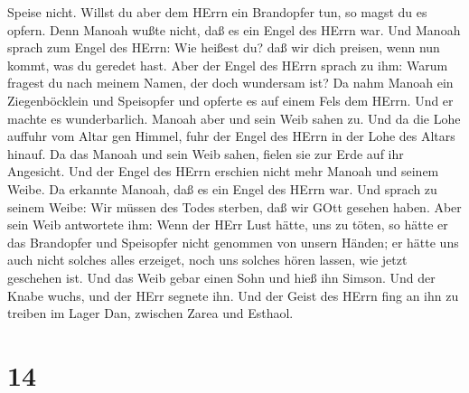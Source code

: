 Speise nicht. Willst du aber dem HErrn ein Brandopfer tun, so magst du
es opfern. Denn Manoah wußte nicht, daß es ein Engel des HErrn war.
 Und Manoah sprach zum Engel des HErrn: Wie heißest du? daß
wir dich preisen, wenn nun kommt, was du geredet hast. 
Aber der Engel des HErrn sprach zu ihm: Warum fragest du nach meinem
Namen, der doch wundersam ist?  Da nahm Manoah ein
Ziegenböcklein und Speisopfer und opferte es auf einem Fels dem HErrn.
Und er machte es wunderbarlich. Manoah aber und sein Weib sahen zu.
 Und da die Lohe auffuhr vom Altar gen Himmel, fuhr der
Engel des HErrn in der Lohe des Altars hinauf. Da das Manoah und sein
Weib sahen, fielen sie zur Erde auf ihr Angesicht.  Und der
Engel des HErrn erschien nicht mehr Manoah und seinem Weibe. Da erkannte
Manoah, daß es ein Engel des HErrn war.  Und sprach zu
seinem Weibe: Wir müssen des Todes sterben, daß wir GOtt gesehen haben.
 Aber sein Weib antwortete ihm: Wenn der HErr Lust hätte,
uns zu töten, so hätte er das Brandopfer und Speisopfer nicht genommen
von unsern Händen; er hätte uns auch nicht solches alles erzeiget, noch
uns solches hören lassen, wie jetzt geschehen ist.  Und das
Weib gebar einen Sohn und hieß ihn Simson. Und der Knabe wuchs, und der
HErr segnete ihn.  Und der Geist des HErrn fing an ihn zu
treiben im Lager Dan, zwischen Zarea und Esthaol.

\hypertarget{section-13}{%
\section{14}\label{section-13}}

